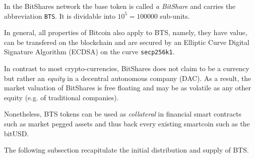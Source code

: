 In the BitShares network the base token is called \emph{a BitShare} and carries
the abbreviation \texttt{BTS}. It is dividable into $10^5=\num{100000}$ sub-units.

In general, all properties of Bitcoin also apply to BTS, namely, they have
value, can be transfered on the blockchain and are secured by an Elliptic
Curve Digital Signature Algorithm (ECDSA) on the curve \texttt{secp256k1}.

In contrast to most crypto-currencies, BitShares does not claim to be a
currency but rather an \emph{equity} in a decentral autonomous company (DAC).
As a result, the market valuation of BitShares is free floating and may be as
volatile as any other equity (e.g. of traditional companies).

Nonetheless, BTS tokens can be used as \emph{collateral} in financial smart
contracts~\cite{bts:financial} such as market pegged assets and thus back every
existing smartcoin such as the bitUSD.


The following subsection recapitulate the initial distribution and supply of
BTS.
